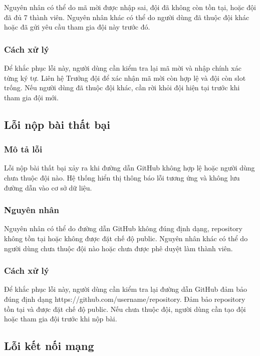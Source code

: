 Nguyên nhân có thể do mã mời được nhập sai, đội đã không còn tồn tại, hoặc đội đã đủ 7 thành viên. Nguyên nhân khác có thể do người dùng đã thuộc đội khác hoặc đã gửi yêu cầu tham gia đội này trước đó.

\subsubsection{Cách xử lý}

Để khắc phục lỗi này, người dùng cần kiểm tra lại mã mời và nhập chính xác từng ký tự. Liên hệ Trưởng đội để xác nhận mã mời còn hợp lệ và đội còn slot trống. Nếu người dùng đã thuộc đội khác, cần rời khỏi đội hiện tại trước khi tham gia đội mới.

\subsection{Lỗi nộp bài thất bại}

\subsubsection{Mô tả lỗi}

Lỗi nộp bài thất bại xảy ra khi đường dẫn GitHub không hợp lệ hoặc người dùng chưa thuộc đội nào. Hệ thống hiển thị thông báo lỗi tương ứng và không lưu đường dẫn vào cơ sở dữ liệu.

\subsubsection{Nguyên nhân}

Nguyên nhân có thể do đường dẫn GitHub không đúng định dạng, repository không tồn tại hoặc không được đặt chế độ public. Nguyên nhân khác có thể do người dùng chưa thuộc đội nào hoặc chưa được phê duyệt làm thành viên.

\subsubsection{Cách xử lý}

Để khắc phục lỗi này, người dùng cần kiểm tra lại đường dẫn GitHub đảm bảo đúng định dạng https://github.com/username/repository. Đảm bảo repository tồn tại và được đặt chế độ public. Nếu chưa thuộc đội, người dùng cần tạo đội hoặc tham gia đội trước khi nộp bài.

\subsection{Lỗi kết nối mạng}

